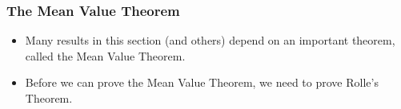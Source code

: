 \begin{frame}
\frametitle{The Mean Value Theorem}
\begin{itemize}
\item  Many results in this section (and others) depend on an important theorem, called the Mean Value Theorem.
\item  Before we can prove the Mean Value Theorem, we need to prove Rolle's Theorem.
\end{itemize}
\end{frame}
